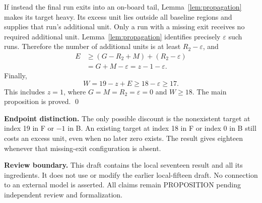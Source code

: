 \documentclass{article}
\begin{document}
If instead the final run exits into an on-board tail, Lemma~\ref{lem:propagation} makes its
target heavy. Its excess unit lies outside all baseline regions and supplies that run's
additional unit. Only a run with a missing exit receives no required additional unit.
Lemma~\ref{lem:propagation} identifies precisely \(\varepsilon\) such runs. Therefore the number
of additional units is at least \(R_2 - \varepsilon\), and
\begin{equation}
  \begin{aligned}
    E &\ge (G - R_2 + M) + (R_2 - \varepsilon) \\
      &= G + M - \varepsilon = z - 1 - \varepsilon.
  \end{aligned}
\end{equation}
Finally,
\begin{equation}
  W = 19 - z + E \ge 18 - \varepsilon \ge 17.
\end{equation}
This includes \(z = 1\), where \(G = M = R_2 = \varepsilon = 0\) and \(W \ge 18\). The main
proposition is proved. \qed

\textbf{Endpoint distinction.} The only possible discount is the nonexistent target at index 19
in F or \(-1\) in B. An existing target at index 18 in F or index 0 in B still costs an excess
unit, even when no later zero exists. The result gives eighteen whenever that missing-exit
configuration is absent.

\textbf{Review boundary.} This draft contains the local seventeen result and all its ingredients.
It does not use or modify the earlier local-fifteen draft. No connection to an external model is
asserted. All claims remain PROPOSITION pending independent review and formalization.
\end{document}
